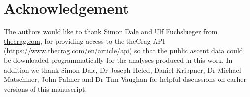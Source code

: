 \documentclass{article}
\begin{document}
\section*{Acknowledgement}

The authors would like to thank Simon Dale and Ulf Fuchslueger from \url{thecrag.com}, for providing access to the theCrag API (\url{https://www.thecrag.com/en/article/api}) so that the public ascent data could be downloaded programmatically for the analyses produced in this work. In addition we thank Simon Dale, Dr Joseph Heled, Daniel Krippner, Dr Michael Matschiner, John Palmer and Dr Tim Vaughan for helpful discussions on earlier versions of this manuscript.

\printglossaries



\end{document}
